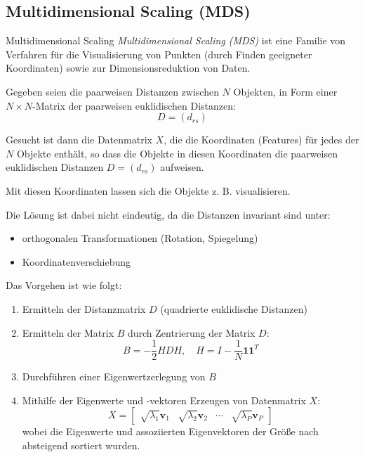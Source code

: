 \subsection{Multidimensional Scaling (MDS)}

\begin{defi}{Multidimensional Scaling}
    \emph{Multidimensional Scaling (MDS)} ist eine Familie von Verfahren für die Visualisierung von Punkten (durch Finden geeigneter Koordinaten) sowie zur Dimensionsreduktion von Daten.

    Gegeben seien die paarweisen Distanzen zwischen $N$ Objekten, in Form einer $N \times N$-Matrix der paarweisen euklidischen Distanzen:
    \[
        D = (d_{rs})
    \]

    Gesucht ist dann die Datenmatrix $X$, die die Koordinaten (Features) für jedes der $N$ Objekte enthält, so dass die Objekte in diesen Koordinaten die paarweisen euklidischen Distanzen $D = (d_{rs})$ aufweisen.

    Mit diesen Koordinaten lassen sich die Objekte z. B. visualisieren.

    Die Lösung ist dabei nicht eindeutig, da die Distanzen invariant sind unter:
    \begin{itemize}
        \item orthogonalen Transformationen (Rotation, Spiegelung)
        \item Koordinatenverschiebung
    \end{itemize}

    Das Vorgehen ist wie folgt:
    \begin{enumerate}
        \item Ermitteln der Distanzmatrix $D$ (quadrierte euklidische Distanzen)
        \item Ermitteln der Matrix $B$ durch Zentrierung der Matrix $D$:
              \[
                  B = - \frac{1}{2} HDH, \quad H = I - \frac{1}{N} \mathbf{1} \mathbf{1}^T
              \]
        \item Durchführen einer Eigenwertzerlegung von $B$
        \item Mithilfe der Eigenwerte und -vektoren Erzeugen von Datenmatrix $X$:
              \[
                  X = \begin{bmatrix}
                      \sqrt{\lambda_1} \mathbf{v}_1 & \sqrt{\lambda_2} \mathbf{v}_2 & \cdots & \sqrt{\lambda_P} \mathbf{v}_P
                  \end{bmatrix}
              \]
              wobei die Eigenwerte und assoziierten Eigenvektoren der Größe nach absteigend sortiert wurden.
    \end{enumerate}
\end{defi}

